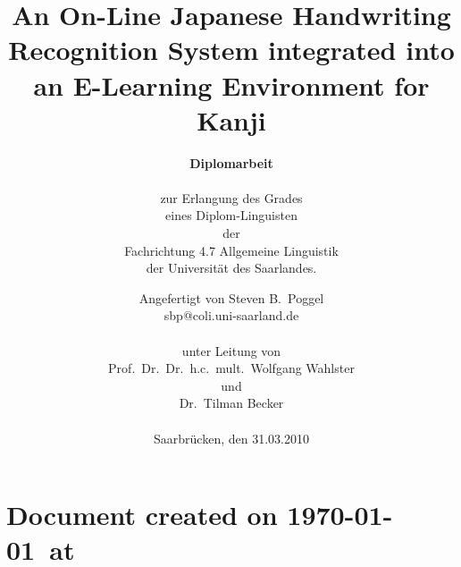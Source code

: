 \documentclass[a4paper]{book}
\title{An On-Line Japanese Handwriting Recognition System integrated into an E-Learning Environment for Kanji}
\author{\textbf{\large Diplomarbeit} \\
\textsc{ } \\
zur Erlangung des Grades \\
eines Diplom-Linguisten\\
der \\
Fachrichtung 4.7 Allgemeine Linguistik \\ 
der Universität des Saarlandes.}
\date{
Angefertigt von
Steven B.~Poggel\\
sbp@coli.uni-saarland.de \\
\textsc{ } \\
unter Leitung von \\
Prof.~Dr.~Dr.~h.c.~mult.~Wolfgang Wahlster \\
und \\
Dr.~Tilman Becker \\
\textsc{ } \\
Saarbrücken, den 31.03.2010}
\begin{document}


% 
 
 

% 
\chapter*{Document created on \today~at \xxivtime}
\end{document}
